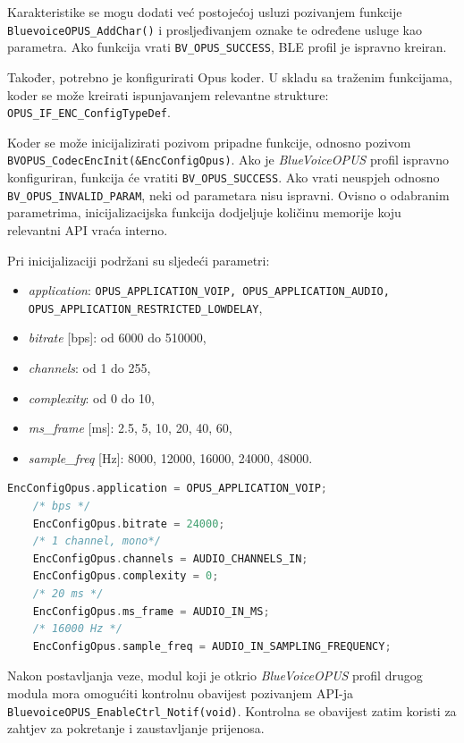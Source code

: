 Karakteristike se mogu dodati već postojećoj usluzi pozivanjem funkcije \newline \lstinline|BluevoiceOPUS_AddChar()| i prosljeđivanjem oznake te određene usluge kao parametra. Ako funkcija vrati \lstinline|BV_OPUS_SUCCESS|, BLE profil je ispravno kreiran.

Također, potrebno je konfigurirati Opus koder. U skladu sa traženim funkcijama, koder se može kreirati ispunjavanjem relevantne strukture: \newline \lstinline|OPUS_IF_ENC_ConfigTypeDef|.

Koder se može inicijalizirati pozivom pripadne funkcije, odnosno pozivom \newline \lstinline|BVOPUS_CodecEncInit(&EncConfigOpus)|. Ako je \textit{BlueVoiceOPUS} profil ispravno konfiguriran, funkcija će vratiti \lstinline|BV_OPUS_SUCCESS|. Ako vrati neuspjeh odnosno \lstinline|BV_OPUS_INVALID_PARAM|, neki od parametara nisu ispravni. Ovisno o odabranim parametrima, inicijalizacijska funkcija dodjeljuje količinu memorije koju relevantni API vraća interno. 

Pri inicijalizaciji podržani su sljedeći parametri:
\begin{itemize}
	\item \textit{application}: \lstinline|OPUS_APPLICATION_VOIP, OPUS_APPLICATION_AUDIO, OPUS_APPLICATION_RESTRICTED_LOWDELAY|,
	\item \textit{bitrate} [bps]: od 6000 do 510000,
	\item \textit{channels}: od 1 do 255,
	\item \textit{complexity}: od 0 do 10,
	\item \textit{ms\_frame} [ms]: 2.5, 5, 10, 20, 40, 60,
	\item \textit{sample\_freq} [Hz]: 8000, 12000, 16000, 24000, 48000.
\end{itemize}

\begin{lstlisting}[caption={Parametri za Opus koder}, language=c]
	EncConfigOpus.application = OPUS_APPLICATION_VOIP;
	/* bps */
	EncConfigOpus.bitrate = 24000; 
	/* 1 channel, mono*/
	EncConfigOpus.channels = AUDIO_CHANNELS_IN; 
	EncConfigOpus.complexity = 0;
	/* 20 ms */
	EncConfigOpus.ms_frame = AUDIO_IN_MS; 
	/* 16000 Hz */
	EncConfigOpus.sample_freq = AUDIO_IN_SAMPLING_FREQUENCY; 
\end{lstlisting}

Nakon postavljanja veze, modul koji je otkrio \textit{BlueVoiceOPUS} profil drugog modula mora omogućiti kontrolnu obavijest pozivanjem API-ja \newline \lstinline|BluevoiceOPUS_EnableCtrl_Notif(void)|. Kontrolna se obavijest zatim koristi za zahtjev za pokretanje i zaustavljanje prijenosa.

